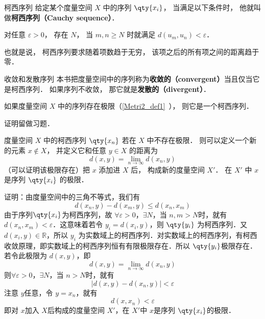 

\begin{definition}{柯西序列}
给定某个度量空间 $X$ 中的序列 $\qty{x_i}$， 当满足以下条件时， 他就叫做\textbf{柯西序列（Cauchy sequence）}．

对任意 $\varepsilon > 0$， 存在 $N$， 当 $m, n \geqslant N$ 时就满足 $d(u_m, u_n) < \varepsilon$．
\end{definition}
也就是说， 柯西序列要求随着项数趋于无穷， 该项之后的所有项之间的距离趋于零．

\begin{definition}{收敛和发散序列}\label{cauchy_def1}
本书把度量空间中的序列称为\textbf{收敛的（convergent）}当且仅当它是柯西序列． 如果序列不收敛， 那它就是\textbf{发散的（divergent）}．
\end{definition}

\begin{theorem}{}
如果度量空间 $X$ 中的序列存在极限（\autoref{Metri2_def1}~）， 则它是一个柯西序列．
\end{theorem}
证明留做习题．

\begin{theorem}{}\label{cauchy_the1}
度量空间 $X$ 中的柯西序列 $\qty{x_n}$ 若在 $X$ 中不存在极限． 则可以定义一个新的元素 $x \notin X$， 并定义它和任意 $y\in X$ 的距离为
\begin{equation}
d(x, y) = \lim_{n\to\infty} d(x_n, y)
\end{equation}
（可以证明该极限存在）把 $x$ 添加进 $X$ 后， 构成新的度量空间 $X'$． 在 $X'$ 中 $x$ 是序列 $\qty{x_i}$ 的极限．
\end{theorem}
证明：由度量空间中的三角不等式，我们有
\begin{equation}
d(x_n,y)-d(x_m,y)\leq d(x_n,x_m)
\end{equation}
由于序列$\qty{x_i}$为柯西序列，故 $\forall\varepsilon>0$，$\exists N$，当 $n,m>N$时，就有 $d(x_n,x_m)<\varepsilon$．这意味着若令 $y_i=d(x_i,y)$，则 $\qty{y_i}$ 为柯西序列．又 $d(x_i,y)\in \mathbb R$，所以 ${y_i}$ 为实数域上的柯西序列．对实数域上的柯西序列，有柯西收敛原理，即实数域上的柯西序列恒有有限极限存在．所以 $\qty{y_i}$极限存在．若令此极限为 $d(x,y)$，即
\begin{equation}
d(x, y) = \lim_{n\to\infty} d(x_n, y)
\end{equation}
则$\forall\varepsilon>0$，$\exists N$，当 $n>N$时，就有 
\begin{equation}
|d(x,y)-d(x_n,y)|<\varepsilon
\end{equation}
注意 $y$任意，令 $y=x_n$，就有
\begin{equation}
d(x,x_n)<\varepsilon
\end{equation}
即对 $x$加入 $X$后构成的度量空间 $X'$，在 $X'$中 $x$是序列 $\qty{x_i}$的极限．

